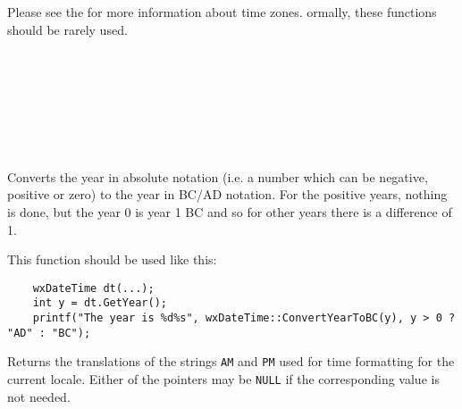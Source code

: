Please see the  for more
information about time zones. ormally, these functions should be rarely used.

\\
\\
\\
\\
\\
\\



\label{wxdatetimeconvertyeartobc}


Converts the year in absolute notation (i.e. a number which can be negative,
positive or zero) to the year in BC/AD notation. For the positive years,
nothing is done, but the year 0 is year 1 BC and so for other years there is a
difference of 1.

This function should be used like this:

\begin{verbatim}
    wxDateTime dt(...);
    int y = dt.GetYear();
    printf("The year is %d%s", wxDateTime::ConvertYearToBC(y), y > 0 ? "AD" : "BC");
\end{verbatim}

\label{wxdatetimegetampmstrings}


Returns the translations of the strings {\tt AM} and {\tt PM} used for time
formatting for the current locale. Either of the pointers may be {\tt NULL} if
the corresponding value is not needed.

\label{wxdatetimegetbegindst}


